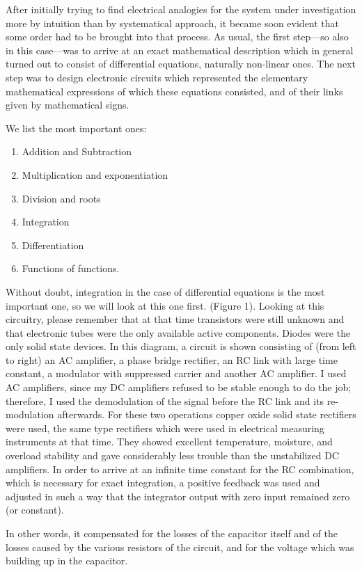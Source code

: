 \documentclass[11pt, a4paper]{article}
\begin{document}
After initially trying to find electrical analogies for the system under investigation more by intuition than by systematical approach, it became soon evident that some order had to be brought into that process. As usual, the first step---so also in this case---was to arrive at an exact mathematical description which in general turned out to consist of differential equations, naturally non-linear ones. The next step was to design electronic circuits which represented the elementary mathematical expressions of which these equations consisted, and of their links given by mathematical signs.

We list the most important ones:
\begin{enumerate}[label={}, noitemsep]
  \item Addition and Subtraction
  \item Multiplication and exponentiation
  \item Division and roots
  \item Integration
  \item Differentiation
  \item Functions of functions.
\end{enumerate}

Without doubt, integration in the case of differential equations is the most important one, so we will look at this one first. (Figure 1). Looking at this circuitry, please remember that at that time transistors were still unknown and that electronic tubes were the only available active components. Diodes were the only solid state devices. In this diagram, a circuit is shown consisting of (from left to right) an AC amplifier, a phase bridge rectifier, an RC link with large time constant, a modulator with suppressed carrier and another AC amplifier. I used AC amplifiers, since my DC amplifiers refused to be stable enough to do the job; therefore, I used the demodulation of the signal before the RC link and its re-modulation afterwards. For these two operations copper oxide solid state rectifiers were used, the same type rectifiers which were used in electrical measuring instruments at that time. They showed excellent temperature, moisture, and overload stability and gave considerably less trouble than the unstabilized DC amplifiers. In order to arrive at an infinite time constant for the RC combination, which is necessary for exact integration, a positive feedback was used and adjusted in such a way that the integrator output with zero input remained zero (or constant).

In other words, it compensated for the losses of the capacitor itself and of the losses caused by the various resistors of the circuit, and for the voltage which was building up in the capacitor.
\end{document}
